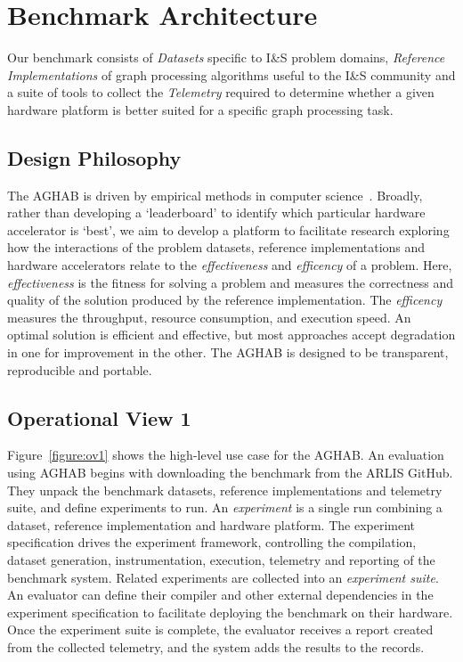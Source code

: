 \section{Benchmark Architecture}\label{section:architecture}
Our benchmark consists of \textit{Datasets} specific to I\&S problem domains, \textit{Reference Implementations} of graph processing algorithms useful to the I\&S community and a suite of tools to collect the \textit{Telemetry} required to determine whether a given hardware platform is better suited for a specific graph processing task. 

\subsection{Design Philosophy}
The AGHAB is driven by empirical methods in computer science~\cite{Hooker1994, Hooker1995, Mcgeoch1996}.
Broadly, rather than developing a `leaderboard' to identify which particular hardware accelerator is `best', we aim to develop a platform to facilitate research exploring how the interactions of the problem datasets, reference implementations and hardware accelerators relate to the \textit{effectiveness} and \textit{efficency} of a problem. 
Here, \textit{effectiveness} is the fitness for solving a problem and measures the correctness and quality of the solution produced by the reference implementation. 
The \textit{efficency} measures the throughput, resource consumption, and execution speed.
An optimal solution is efficient and effective, but most approaches accept degradation in one for improvement in the other. 
The AGHAB is designed to be transparent, reproducible and portable.

\subsection{Operational View 1}
Figure~\ref{figure:ov1} shows the high-level use case for the AGHAB. 
An evaluation using AGHAB begins with downloading the benchmark from the ARLIS GitHub. 
They unpack the benchmark datasets, reference implementations and telemetry suite, and define experiments to run.
An \textit{experiment} is a single run combining a dataset, reference implementation and hardware platform.
The experiment specification drives the experiment framework, controlling the compilation, dataset generation, instrumentation, execution, telemetry and reporting of the benchmark system.
Related experiments are collected into an \textit{experiment suite}.
An evaluator can define their compiler and other external dependencies in the experiment specification to facilitate deploying the benchmark on their hardware.
Once the experiment suite is complete, the evaluator receives a report created from the collected telemetry, and the system adds the results to the records. 
\begin{figure*}
    \centering
    
    \caption{A user of the AGHAB provides their hardware, compiler and a specification of the experiments to run. They may optionally define a new experiment subclass if required to integrate their hardware into the experiment framework.}
    \label{figure:ov1}
\end{figure*}

